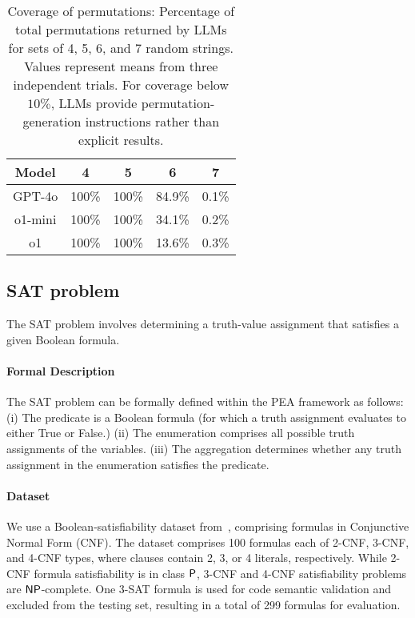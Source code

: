 \begin{table}[th]
\begin{center}
\caption{Coverage of permutations: Percentage of total permutations returned by LLMs for sets of 4, 5, 6, and 7 random strings. Values represent means from three independent trials. For coverage below $10\%$, LLMs provide permutation-generation instructions rather than explicit results.}
\begin{tabular}{ ccccc } 
\toprule
\bf Model & \bf 4 & \bf 5 & \bf 6 & \bf 7 \\  
\hline
GPT-4o & 100\%  & 100\% & 84.9\% & 0.1\% \\  
\hline
o1-mini &  100\% &  100\% &  34.1\% &  0.2\% \\  
\hline
o1 &  100\% &  100\% &  13.6\% &  0.3\% \\  
  \bottomrule
\end{tabular}
\label{tab:perm}
\end{center}
\vspace{-0.3cm}
\end{table}

\subsection{SAT problem}\label{sec:sat}
The SAT problem involves determining a truth-value assignment that satisfies a given Boolean formula.

\paragraph{Formal Description} The SAT problem can be formally defined within the PEA framework as follows:
(i) The predicate is a Boolean formula
(for which a truth assignment evaluates to either True or False.) %
(ii) The enumeration comprises all possible truth assignments of the variables.
(iii) The aggregation determines whether any truth assignment in the enumeration satisfies the predicate.

\paragraph{Dataset}We use a Boolean-satisfiability dataset from~\citet{marino2024fastanalysisopenaio1preview}, comprising formulas in Conjunctive Normal Form (CNF). The dataset comprises 100 formulas each of 2-CNF, 3-CNF, and 4-CNF types, where clauses contain 2, 3, or 4 literals, respectively. While 2-CNF formula satisfiability is in class $\mathsf{P}$, 3-CNF and 4-CNF satisfiability problems are $\mathsf{NP}$-complete. One 3-SAT formula is used for code semantic validation and excluded from the testing set, resulting in a total of 299 formulas for evaluation.


